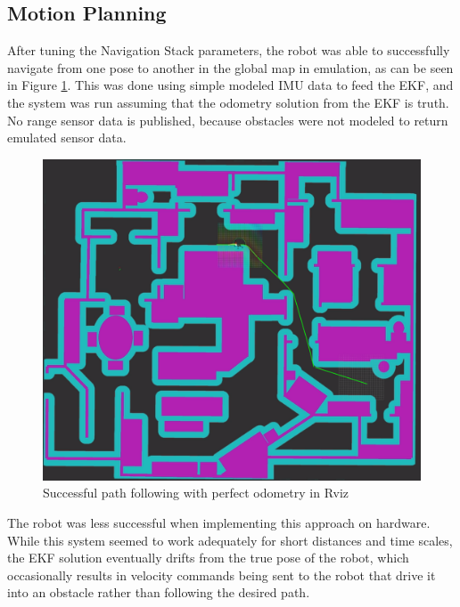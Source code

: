 \subsection{ Motion Planning }

After tuning the Navigation Stack parameters, the robot was able to successfully navigate from one pose to another in the global map in emulation, as can be seen in Figure \ref{fig:sim_path_following}. This was done using simple modeled IMU data to feed the EKF, and the system was run assuming that the odometry solution from the EKF is truth. No range sensor data is published, because obstacles were not modeled to return emulated sensor data. 

\begin{figure}[H]
    \centerline{\includegraphics[scale=0.14]{./06_results/figures/successful_motion_planning.png}}
    \caption{Successful path following with perfect odometry in Rviz}
    \label{fig:sim_path_following}
\end{figure}

The robot was less successful when implementing this approach on hardware. While this system seemed to work adequately for short distances and time scales, the EKF solution eventually drifts from the true pose of the robot, which occasionally results in velocity commands being sent to the robot that drive it into an obstacle rather than following the desired path. 

